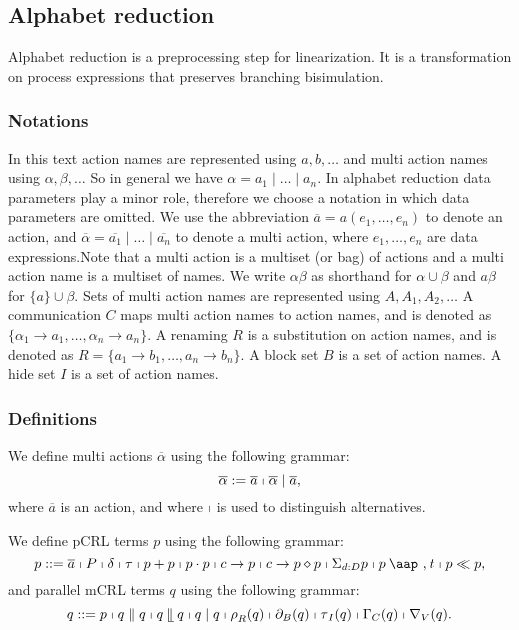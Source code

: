 \documentclass{article}
\providecommand{\at}{\mathbin{\mbox{\aap ,}}}
\providecommand{\leftmerge}{\mathbin{\mathrel{\llfloor}}}
\begin{document}
\newpage

\subsection{Alphabet reduction}

Alphabet reduction is a preprocessing step for linearization. It is a
transformation on process expressions that preserves branching bisimulation.

\subsubsection{Notations}

In this text action names are represented using $a,b,\ldots $ and multi
action names using $\alpha ,\beta ,\ldots $ So in general we have $\alpha
=a_{1}\mid \ldots \mid a_{n}$. In alphabet reduction data parameters play a
minor role, therefore we choose a notation in which data parameters are
omitted. We use the abbreviation $\overline{a}=a(e_{1},\ldots ,e_{n})$ to
denote an action, and $\overline{\alpha }=\overline{a_{1}}\mid \ldots \mid 
\overline{a_{n}}$ to denote a multi action, where $e_{1},\ldots ,e_{n}$ are
data expressions.Note that a multi action is a multiset (or bag) of actions
and a multi action name is a multiset of names. We write $\alpha \beta $ as
shorthand for $\alpha \cup \beta $ and $a\beta $ for $\{a\}\cup \beta $.
Sets of multi action names are represented using $A,A_{1},A_{2},\ldots $ A
communication $C$ maps multi action names to action names, and is denoted as 
$\{\alpha _{1}\rightarrow a_{1},\ldots ,\alpha _{n}\rightarrow a_{n}\}$. A
renaming $R$ is a substitution on action names, and is denoted as $%
R=\{a_{1}\rightarrow b_{1},\ldots ,a_{n}\rightarrow b_{n}\}$. A block set $B$
is a set of action names. A hide set $I$ is a set of action names.

\subsubsection{Definitions}

We define multi actions $\overline{\alpha }$ using the following grammar:%
\[
\overline{\alpha }:=\overline{a}\shortmid \overline{\alpha }\mid \overline{a}%
, 
\]%
where $\overline{a}$ is an action, and where $\shortmid $ is used to
distinguish alternatives.

We define pCRL terms $p$ using the following grammar:%
\[
p::=\overline{a}\shortmid P\shortmid \delta \shortmid \tau \shortmid
p+p\shortmid p\cdot p\shortmid c\rightarrow p\shortmid c\rightarrow
p\diamond p\shortmid \Sigma _{d:D}p\shortmid p\at t\shortmid p\ll p, 
\]%
and parallel mCRL terms $q$ using the following grammar:%
\[
q::=p\shortmid q\parallel q\shortmid q\leftmerge q\shortmid q\mid q\shortmid
\rho _{R}(q)\shortmid \partial _{B}(q)\shortmid \tau _{I}(q)\shortmid \Gamma
_{C}(q)\shortmid \nabla _{V}(q). 
\]
\end{document}
